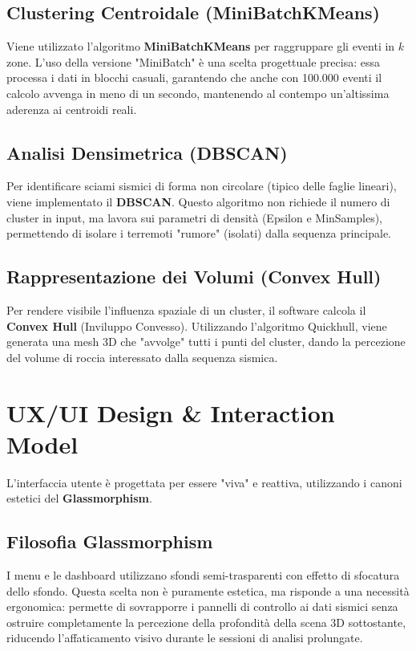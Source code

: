 \documentclass[12pt,a4paper]{article}
\begin{document}
\subsection{Clustering Centroidale (MiniBatchKMeans)}
Viene utilizzato l'algoritmo \textbf{MiniBatchKMeans} per raggruppare gli eventi in $k$ zone. L'uso della versione "MiniBatch" è una scelta progettuale precisa: essa processa i dati in blocchi casuali, garantendo che anche con 100.000 eventi il calcolo avvenga in meno di un secondo, mantenendo al contempo un'altissima aderenza ai centroidi reali.

\subsection{Analisi Densimetrica (DBSCAN)}
Per identificare sciami sismici di forma non circolare (tipico delle faglie lineari), viene implementato il \textbf{DBSCAN}. Questo algoritmo non richiede il numero di cluster in input, ma lavora sui parametri di densità (Epsilon e MinSamples), permettendo di isolare i terremoti "rumore" (isolati) dalla sequenza principale.

\subsection{Rappresentazione dei Volumi (Convex Hull)}
Per rendere visibile l'influenza spaziale di un cluster, il software calcola il \textbf{Convex Hull} (Inviluppo Convesso). Utilizzando l'algoritmo Quickhull, viene generata una mesh 3D che "avvolge" tutti i punti del cluster, dando la percezione del volume di roccia interessato dalla sequenza sismica.

\section{UX/UI Design \& Interaction Model}
L'interfaccia utente è progettata per essere "viva" e reattiva, utilizzando i canoni estetici del \textbf{Glassmorphism}.

\subsection{Filosofia Glassmorphism}
I menu e le dashboard utilizzano sfondi semi-trasparenti con effetto di sfocatura dello sfondo. Questa scelta non è puramente estetica, ma risponde a una necessità ergonomica: permette di sovrapporre i pannelli di controllo ai dati sismici senza ostruire completamente la percezione della profondità della scena 3D sottostante, riducendo l'affaticamento visivo durante le sessioni di analisi prolungate.
\end{document}
